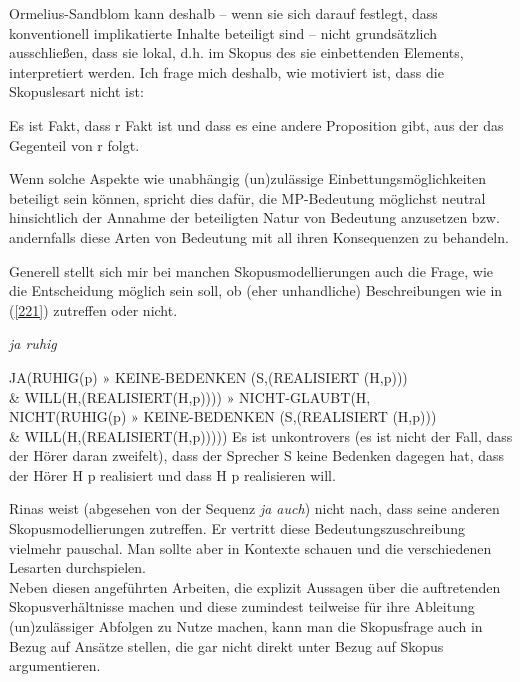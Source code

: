 Ormelius-Sandblom kann deshalb – wenn sie sich darauf festlegt, dass konventionell implikatierte Inhalte beteiligt sind – nicht grundsätzlich ausschließen, dass sie lokal, d.h. im Skopus des sie einbettenden Elements, interpretiert werden. Ich frage mich deshalb, wie motiviert ist, dass die Skopuslesart nicht ist: 

\begin{exe}
	\ex\label{220}									 
	\glq Es ist Fakt, dass r Fakt ist und dass es eine andere Proposition gibt, aus der das Gegenteil von r folgt.\grq {}
\end{exe}
Wenn solche Aspekte wie unabhängig (un)zulässige Einbettungsmöglichkeiten beteiligt sein können, spricht dies dafür, die MP-Bedeutung möglichst neutral hinsichtlich der Annahme der beteiligten Natur von Bedeutung anzusetzen bzw. andernfalls diese Arten von Bedeutung mit all ihren Konsequenzen zu behandeln.

Generell stellt sich mir bei manchen Skopusmodellierungen auch die Frage, wie die Entscheidung möglich sein soll, ob (eher unhandliche) Beschreibungen wie in (\ref{221}) zutreffen oder nicht.
	
\begin{exe}
	\ex\label{221} 
		\textit{ja ruhig}
		\begin{xlist}	
			\ex\label{221a} JA(RUHIG(p) $»$ KEINE-BEDENKEN (S,(REALISIERT (H,p)))\\ \& WILL(H,(REALISIERT(H,p))))
			$»$ NICHT-GLAUBT(H,\\ NICHT(RUHIG(p) $»$ KEINE-BEDENKEN (S,(REALISIERT (H,p))) \\ \& WILL(H,(REALISIERT(H,p)))))		
			\ex\label{221b} \glq Es ist unkontrovers (es ist nicht der Fall, dass der Hörer daran zweifelt), dass der Sprecher S keine Bedenken dagegen hat, dass der Hörer H p realisiert und dass H p realisieren will.\grq {}
			\hfill\hbox {\citet[436]{Rinas2007}}
		\end{xlist}
\end{exe}
Rinas weist (abgesehen von der Sequenz \textit{ja auch}) nicht nach, dass seine anderen Skopusmodellierungen zutreffen. Er vertritt diese Bedeutungszuschreibung viel\-mehr pauschal. Man sollte aber in Kontexte schauen und die verschiedenen Lesarten durchspielen.\\

\noindent
Neben diesen angeführten Arbeiten, die explizit Aussagen über die auftretenden Skopusverhältnisse machen und diese zumindest teilweise für ihre Ableitung (un)zulässiger Abfolgen zu Nutze machen, kann man die Skopusfrage auch in Bezug auf Ansätze stellen, die gar nicht direkt unter Bezug auf Skopus argumentieren.

